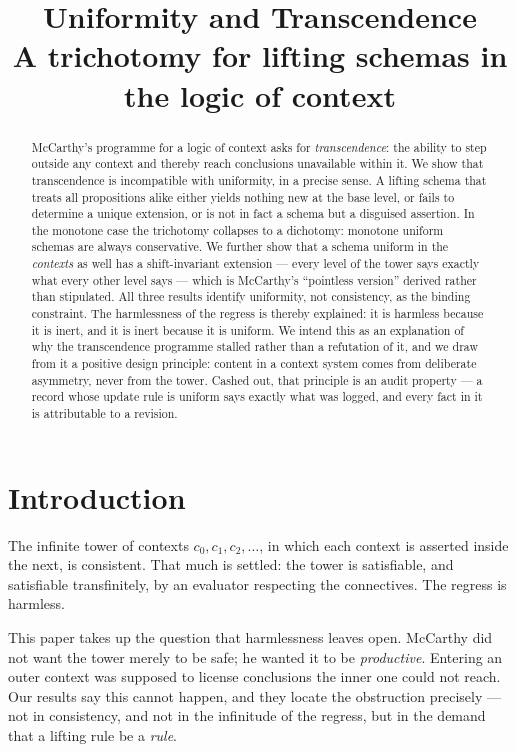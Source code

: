 \documentclass[11pt]{article}
\title{Uniformity and Transcendence\\
\large A trichotomy for lifting schemas in the logic of context}
\author{}
\date{}
\theoremstyle{plain}
\theoremstyle{definition}
\theoremstyle{remark}
\begin{document}
\maketitle

\begin{abstract}
McCarthy's programme for a logic of context asks for \emph{transcendence}: the
ability to step outside any context and thereby reach conclusions unavailable
within it. We show that transcendence is incompatible with uniformity, in a
precise sense. A lifting schema that treats all propositions alike either
yields nothing new at the base level, or fails to determine a unique extension,
or is not in fact a schema but a disguised assertion. In the monotone case the
trichotomy collapses to a dichotomy: monotone uniform schemas are always
conservative. We further show that a schema uniform in the \emph{contexts} as
well has a shift-invariant extension --- every level of the tower says exactly
what every other level says --- which is McCarthy's ``pointless version''
derived rather than stipulated. All three results identify uniformity, not
consistency, as the binding constraint. The harmlessness of the regress is
thereby explained: it is harmless because it is inert, and it is inert because
it is uniform. We intend this as an explanation of why the transcendence
programme stalled rather than a refutation of it, and we draw from it a positive
design principle: content in a context system comes from deliberate asymmetry,
never from the tower. Cashed out, that principle is an audit property --- a
record whose update rule is uniform says exactly what was logged, and every fact
in it is attributable to a revision.
\end{abstract}

\section{Introduction}

The infinite tower of contexts $c_0, c_1, c_2, \dots$, in which each context is
asserted inside the next, is consistent. That much is settled: the tower is
satisfiable, and satisfiable transfinitely, by an evaluator respecting the
connectives. The regress is harmless.

This paper takes up the question that harmlessness leaves open. McCarthy did not
want the tower merely to be safe; he wanted it to be \emph{productive}. Entering
an outer context was supposed to license conclusions the inner one could not
reach. Our results say this cannot happen, and they locate the obstruction
precisely --- not in consistency, and not in the infinitude of the regress, but
in the demand that a lifting rule be a \emph{rule}.
\end{document}
